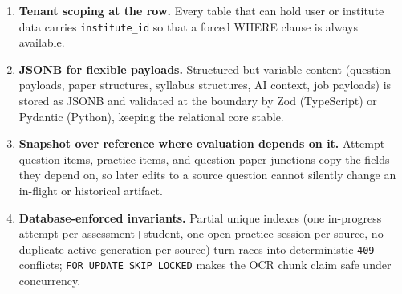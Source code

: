 \begin{enumerate}
  \item \textbf{Tenant scoping at the row.} Every table that can hold user or
  institute data carries \texttt{institute\_id} so that a forced WHERE clause
  is always available.
  \item \textbf{JSONB for flexible payloads.} Structured-but-variable content
  (question payloads, paper structures, syllabus structures, AI context,
  job payloads) is stored as JSONB and validated at the boundary by Zod
  (TypeScript) or Pydantic (Python), keeping the relational core stable.
  \item \textbf{Snapshot over reference where evaluation depends on it.}
  Attempt question items, practice items, and question-paper junctions copy
  the fields they depend on, so later edits to a source question cannot
  silently change an in-flight or historical artifact.
  \item \textbf{Database-enforced invariants.} Partial unique indexes (one
  in-progress attempt per assessment+student, one open practice session per
  source, no duplicate active generation per source) turn races into
  deterministic \texttt{409} conflicts; \texttt{FOR UPDATE SKIP LOCKED} makes
  the OCR chunk claim safe under concurrency.
\end{enumerate}